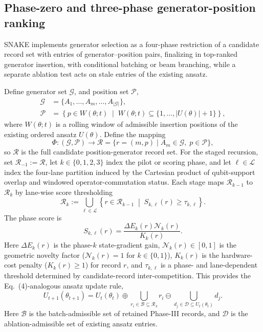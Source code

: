 \documentclass[
  reprint,
  amsmath,
  amssymb,
  aps,
  pra,
  nofootinbib,
  superscriptaddress,
  floatfix
]{revtex4-2}
\newcommand{\Gset}{\mathcal{G}}
\newcommand{\Pcal}{\mathcal{P}}
\begin{document}
\label{sec:static_method}

\subsection{Phase-zero and three-phase generator-position ranking}

SNAKE implements generator selection as a four-phase restriction of a candidate record set with entries of generator--position pairs, finalizing in top-ranked generator insertion, with conditional batching or beam branching, while a separate ablation test acts on stale entries of the existing ansatz.

Define generator set $\Gset$, and position set $\Pcal$,
\begin{equation}
\begin{aligned}
\Gset&=\{A_1,\ldots,A_m,\ldots,A_{|\Gset|}\},\\
\Pcal
&=
\left\{
p\in W(\theta;t)
\;\middle|\;
W(\theta;t)\subseteq\{1,\ldots,|U(\theta)|+1\}
\right\},
\end{aligned}
\label{eq:generator_position_sets}
\end{equation}
where $W(\theta;t)$ is a rolling window of admissible insertion positions of the existing ordered ansatz $U(\theta)$.  Define the mapping
\begin{equation}
\Phi:(\Gset,\Pcal)\longrightarrow
\mathcal R
=
\{r=(m,p)\mid A_m\in\Gset,\;p\in\Pcal\},
\label{eq:record_mapping}
\end{equation}
so $\mathcal R$ is the full candidate position-generator record set. For the staged recursion, set $\mathcal R_{-1}:=\mathcal R$, let $k\in\{0,1,2,3\}$ index the pilot or scoring phase, and let $\ell\in\mathcal L$ index the four-lane partition induced by the Cartesian product of qubit-support overlap and windowed operator-commutation status. Each stage maps $\mathcal R_{k-1}$ to $\mathcal R_k$ by lane-wise score thresholding
\begin{equation}
\mathcal R_k
:=
\bigcup_{\ell\in\mathcal L}
\left\{
r\in\mathcal R_{k-1}
\;\middle|\;
S_{k,\ell}(r)\ge\tau_{k,\ell}
\right\}.
\label{eq:phase_restriction_map}
\end{equation}
The phase score is
\begin{equation}
S_{k,\ell}(r)
=
\frac{\Delta E_k(r)\mathcal N_k(r)}{K_k(r)}.
\label{eq:master_phase_score}
\end{equation}
Here $\Delta E_k(r)$ is the phase-$k$ state-gradient gain, $\mathcal N_k(r)\in[0,1]$ is the geometric novelty factor ($\mathcal N_k(r)=1$ for $k\in\{0,1\}$), $K_k(r)$ is the hardware-cost penalty ($K_k(r)\ge1$) for record $r$, and $\tau_{k,\ell}$ is a phase- and lane-dependent threshold determined by candidate-record inter-competition. This provides the Eq.~(4)-analogous ansatz update rule,
\begin{equation}
U_{t+1}(\theta_{t+1})
=
U_t(\theta_t)
\oplus
\bigcup_{r_i\in\mathcal B\subseteq\mathcal R_3}r_i
\ominus
\bigcup_{d_j\in\mathcal D\subseteq U_t(\theta_t)}d_j .
\label{eq:snake_ansatz_update}
\end{equation}
Here $\mathcal B$ is the batch-admissible set of retained Phase-III records, and $\mathcal D$ is the ablation-admissible set of existing ansatz entries.
\end{document}
